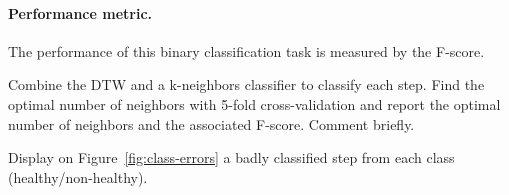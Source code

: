 \documentclass[11pt]{article}
\begin{document}
\paragraph{Performance metric.} The performance of this binary classification task is measured by the F-score.


\begin{exercise}
Combine the DTW and a k-neighbors classifier to classify each step. Find the optimal number of neighbors with 5-fold cross-validation and report the optimal number of neighbors and the associated F-score. Comment briefly.
\end{exercise}

\begin{solution}

\end{solution}

\newpage
\begin{exercise}\label{q:class-errors}
Display on Figure~\ref{fig:class-errors} a badly classified step from each class (healthy/non-healthy).
\end{exercise}

\end{document}
